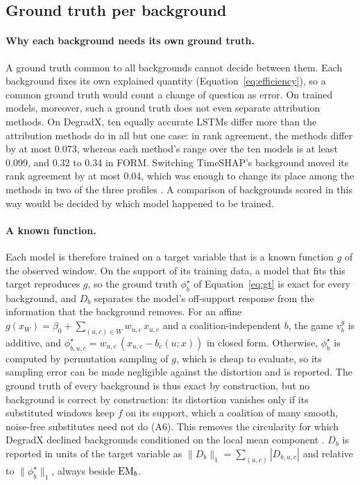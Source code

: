 \documentclass{article}
\begin{document}
\subsection{Ground truth per background}\label{sec:eval:gt}

\paragraph{Why each background needs its own ground truth.} A ground truth common to all backgrounds cannot decide between them. Each background fixes its own explained quantity (Equation~\eqref{eq:efficiency}), so a common ground truth would count a change of question as error. On trained models, moreover, such a ground truth does not even separate attribution methods. On DegradX, ten equally accurate LSTMs differ more than the attribution methods do in all but one case: in rank agreement, the methods differ by at most 0.073, whereas each method's range over the ten models is at least 0.099, and 0.32 to 0.34 in FORM. Switching TimeSHAP's background moved its rank agreement by at most 0.04, which was enough to change its place among the methods in two of the three profiles \citep{degradx2026}. A comparison of backgrounds scored in this way would be decided by which model happened to be trained.

\paragraph{A known function.} Each model is therefore trained on a target variable that is a known function $g$ of the observed window. On the support of its training data, a model that fits this target reproduces $g$, so the ground truth $\phi^\star_b$ of Equation~\eqref{eq:gt} is exact for every background, and $D_b$ separates the model's off-support response from the information that the background removes. For an affine $g(x_W) = \beta_0 + \sum_{(u,c)\in W} w_{u,c}\,x_{u,c}$ and a coalition-independent $b$, the game $v^g_b$ is additive, and $\phi^\star_{b,u,c} = w_{u,c}\,(x_{u,c}-b_c(u;x))$ in closed form. Otherwise, $\phi^\star_b$ is computed by permutation sampling of $g$, which is cheap to evaluate, so its sampling error can be made negligible against the distortion and is reported. The ground truth of every background is thus exact by construction, but no background is correct by construction: its distortion vanishes only if its substituted windows keep $f$ on its support, which a coalition of many smooth, noise-free substitutes need not do (A6). This removes the circularity for which DegradX declined backgrounds conditioned on the local mean component \citep{degradxrepo}. $D_b$ is reported in units of the target variable as $\|D_b\|_1=\sum_{(u,c)}|D_{b,u,c}|$ and relative to $\|\phi^\star_b\|_1$, always beside $\mathrm{EM}_b$.
\end{document}
